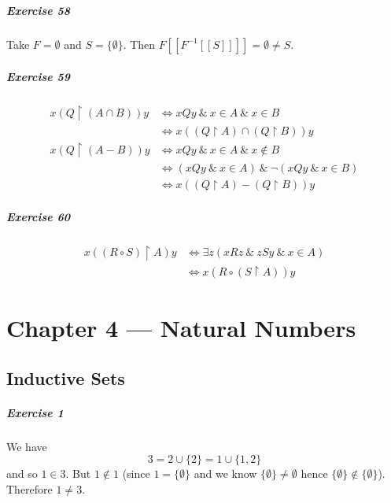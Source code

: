 \documentclass{report}
\begin{document}
    \paragraph{Exercise 58}
    Take $F = \emptyset$ and $S = \{ \emptyset \}$. Then $F [\![ F^{-1} [\![ S ]\!] ]\!] = \emptyset \neq S$.

    \paragraph{Exercise 59}
    \begin{align*}
        x (Q \restriction (A \cap B)) y & \Leftrightarrow xQy\ \&\ x \in A\ \&\ x \in B \\
        & \Leftrightarrow x ((Q \restriction A) \cap (Q \restriction B)) y \\
        x (Q \restriction (A - B)) y & \Leftrightarrow xQy\ \&\ x \in A\ \&\ x \notin B \\
        & \Leftrightarrow (xQy\ \&\ x \in A) \ \&\ \neg (xQy\ \&\ x \in B) \\
        & \Leftrightarrow x ((Q \restriction A) - (Q \restriction B)) y
    \end{align*}

    \paragraph{Exercise 60}
    \begin{align*}
        x((R \circ S) \restriction A) y & \Leftrightarrow \exists z (xRz\ \&\ zSy\ \&\ x \in A) \\
        & \Leftrightarrow x(R \circ (S \restriction A)) y
    \end{align*}

    \chapter{Chapter 4 --- Natural Numbers}

    \section{Inductive Sets}

    \paragraph{Exercise 1}
    We have 
    \[ 3 = 2 \cup \{ 2 \} = 1 \cup \{ 1, 2 \} \]
    and so $1 \in 3$. But $1 \notin 1$ (since $1 = \{ \emptyset \}$ and we know $\{ \emptyset \} \neq
    \emptyset$ hence $\{ \emptyset \} \notin \{ \emptyset \}$). Therefore $1 \neq 3$.
\end{document}
